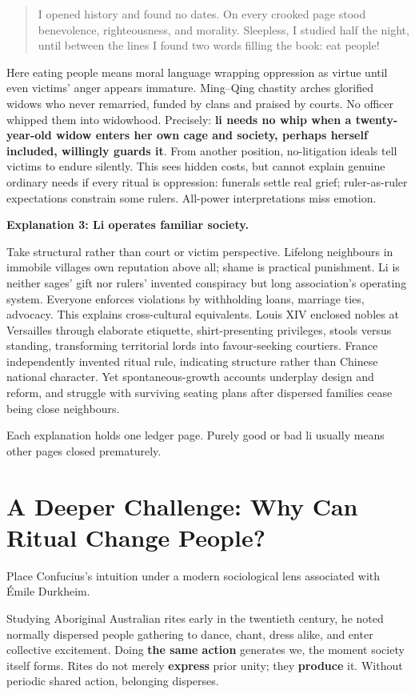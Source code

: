 \begin{quote}
I opened history and found no dates. On every crooked page stood benevolence, righteousness, and morality. Sleepless, I studied half the night, until between the lines I found two words filling the book: eat people!
\end{quote}
Here eating people means moral language wrapping oppression as virtue until even victims' anger appears immature. Ming--Qing chastity arches glorified widows who never remarried, funded by clans and praised by courts. No officer whipped them into widowhood. Precisely: \textbf{li needs no whip when a twenty-year-old widow enters her own cage and society, perhaps herself included, willingly guards it}. From another position, no-litigation ideals tell victims to endure silently. This sees hidden costs, but cannot explain genuine ordinary needs if every ritual is oppression: funerals settle real grief; ruler-as-ruler expectations constrain some rulers. All-power interpretations miss emotion.

\textbf{Explanation 3: Li operates familiar society.}

Take structural rather than court or victim perspective. Lifelong neighbours in immobile villages own reputation above all; shame is practical punishment. Li is neither sages' gift nor rulers' invented conspiracy but long association's operating system. Everyone enforces violations by withholding loans, marriage ties, advocacy. This explains cross-cultural equivalents. Louis XIV enclosed nobles at Versailles through elaborate etiquette, shirt-presenting privileges, stools versus standing, transforming territorial lords into favour-seeking courtiers. France independently invented ritual rule, indicating structure rather than Chinese national character. Yet spontaneous-growth accounts underplay design and reform, and struggle with surviving seating plans after dispersed families cease being close neighbours.

Each explanation holds one ledger page. Purely good or bad li usually means other pages closed prematurely.

\section[Further Challenge: Ritual Changes People]{A Deeper Challenge: Why Can Ritual Change People?}
Place Confucius's intuition under a modern sociological lens associated with Émile Durkheim.

Studying Aboriginal Australian rites early in the twentieth century, he noted normally dispersed people gathering to dance, chant, dress alike, and enter collective excitement. Doing \textbf{the same action} generates we, the moment society itself forms. Rites do not merely \textbf{express} prior unity; they \textbf{produce} it. Without periodic shared action, belonging disperses.

